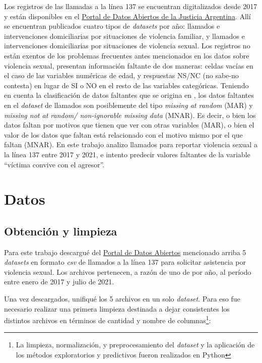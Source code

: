 \documentclass[10 pt]{article}
\begin{document}
Los registros de las llamadas a la línea 137 se encuentran digitalizados desde 2017 y están disponibles en el \href{http://datos.jus.gob.ar/}{Portal de Datos Abiertos de la Justicia Argentina}. Allí se encuentran publicados cuatro tipos de \textit{datasets} por año: llamados e intervenciones domiciliarias por situaciones de violencia familiar, y llamados e intervenciones domiciliarias por situaciones de violencia sexual.
Los registros no están exentos de los problemas frecuentes antes mencionados en los datos sobre violencia sexual, presentan información faltante de dos maneras: celdas vacías en el caso de las variables numéricas de edad, y respuestas NS/NC (no sabe-no contesta) en lugar de SI o NO en el resto de las variables categóricas. Teniendo en cuenta la clasificación de datos faltantes que se origina en \citet{rubin1976inference}, los datos faltantes en el \textit{dataset} de llamados son posiblemente del tipo \textit{missing at random} (MAR) y \textit{missing not at random/ non-ignorable missing data} (MNAR). Es decir, o bien los datos faltan por motivos que tienen que ver con otras variables (MAR), o bien el valor de los datos que faltan está relacionado con el motivo mismo por el que faltan (MNAR).
En este trabajo analizo llamados para reportar violencia sexual a la línea 137 entre 2017 y 2021, e intento predecir valores faltantes de la variable “víctima convive con el agresor”. 



\section*{Datos}\label{datos}

\subsection*{Obtención y limpieza}\label{limpieza}
Para este trabajo descargué del \href{http://datos.jus.gob.ar/}{Portal de Datos Abiertos} mencionado arriba 5 \textit{datasets} en formato \textit{csv} de llamados a la línea 137 para solicitar asistencia por violencia sexual. Los archivos pertenecen, a razón de uno de por año, al período entre enero de 2017 y julio de 2021. 

Una vez descargados, unifiqué los 5 archivos en un solo \textit{dataset}. Para eso fue necesario realizar una primera limpieza destinada a dejar consistentes los distintos archivos en términos de cantidad y nombre de columnas\footnote{La limpieza, normalización, y preprocesamiento del \textit{dataset} y la aplicación de los métodos exploratorios y predictivos fueron realizados en Python}:
\end{document}
